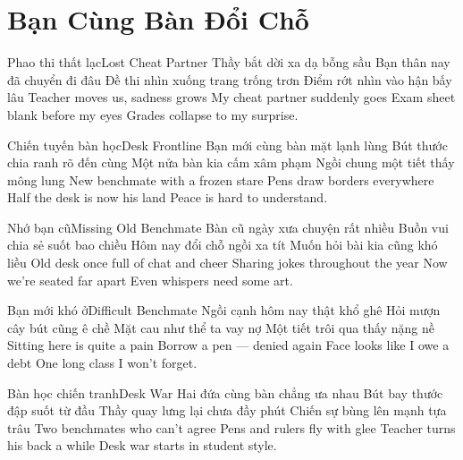 \chapter{Bạn Cùng Bàn Đổi Chỗ}

\begin{tutuyetbox}{Phao thi thất lạc}{Lost Cheat Partner}
Thầy bắt dời xa dạ bỗng sầu
Bạn thân nay đã chuyển đi đâu
Đề thi nhìn xuống trang trống trơn
Điểm rớt nhìn vào hận bấy lâu
\tcblower
Teacher moves us, sadness grows
My cheat partner suddenly goes
Exam sheet blank before my eyes
Grades collapse to my surprise.
\end{tutuyetbox}

\begin{tutuyetbox}{Chiến tuyến bàn học}{Desk Frontline}
Bạn mới cùng bàn mặt lạnh lùng
Bút thước chia ranh rõ đến cùng
Một nửa bàn kia cấm xâm phạm
Ngồi chung một tiết thấy mông lung
\tcblower
New benchmate with a frozen stare
Pens draw borders everywhere
Half the desk is now his land
Peace is hard to understand.
\end{tutuyetbox}

\begin{tutuyetbox}{Nhớ bạn cũ}{Missing Old Benchmate}
Bàn cũ ngày xưa chuyện rất nhiều
Buồn vui chia sẻ suốt bao chiều
Hôm nay đổi chỗ ngồi xa tít
Muốn hỏi bài kia cũng khó liều
\tcblower
Old desk once full of chat and cheer
Sharing jokes throughout the year
Now we're seated far apart
Even whispers need some art.
\end{tutuyetbox}

\begin{tutuyetbox}{Bạn mới khó ở}{Difficult Benchmate}
Ngồi cạnh hôm nay thật khổ ghê
Hỏi mượn cây bút cũng ê chề
Mặt cau như thể ta vay nợ
Một tiết trôi qua thấy nặng nề
\tcblower
Sitting here is quite a pain
Borrow a pen — denied again
Face looks like I owe a debt
One long class I won't forget.
\end{tutuyetbox}

\begin{tutuyetbox}{Bàn học chiến tranh}{Desk War}
Hai đứa cùng bàn chẳng ưa nhau
Bút bay thước đập suốt từ đầu
Thầy quay lưng lại chưa đầy phút
Chiến sự bùng lên mạnh tựa trâu
\tcblower
Two benchmates who can't agree
Pens and rulers fly with glee
Teacher turns his back a while
Desk war starts in student style.
\end{tutuyetbox}

